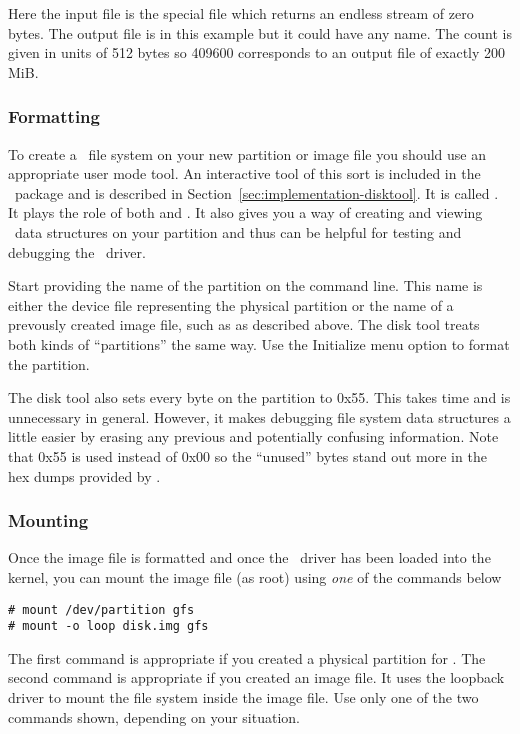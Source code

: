 Here the input file is the special file  which returns an endless stream of
zero bytes. The output file is  in this example but it could have any name.
The count is given in units of 512 bytes so 409600 corresponds to an output file of exactly 200
MiB.

\subsubsection{Formatting}

To create a \GenericFS\ file system on your new partition or image file you should use an
appropriate user mode tool. An interactive tool of this sort is included in the \GenericFS\
package and is described in Section~\ref{sec:implementation-disktool}. It is called
\command{disktool}. It plays the role of both \command{mkfs} and \command{fsck}. It also gives
you a way of creating and viewing \GenericFS\ data structures on your partition and thus can be
helpful for testing and debugging the \GenericFS\ driver.

Start  providing the name of the partition on the command line. This name is
either the device file representing the physical partition or the name of a prevously created
image file, such as \filename{disk.img} as described above. The disk tool treats both kinds of
``partitions'' the same way. Use the Initialize menu option to format the partition.

The disk tool also sets every byte on the partition to 0x55. This takes time and is unnecessary
in general. However, it makes debugging file system data structures a little easier by erasing
any previous and potentially confusing information. Note that 0x55 is used instead of 0x00 so
the ``unused'' bytes stand out more in the hex dumps provided by \command{disktool}.

\subsubsection{Mounting}

Once the image file is formatted and once the \GenericFS\ driver has been loaded into the
kernel, you can mount the image file (as root) using \emph{one} of the commands below
\begin{verbatim}
# mount /dev/partition gfs
# mount -o loop disk.img gfs
\end{verbatim}

The first command is appropriate if you created a physical partition for \GenericFS. The second
command is appropriate if you created an image file. It uses the loopback driver to mount the
file system inside the image file. Use only one of the two commands shown, depending on your
situation.

